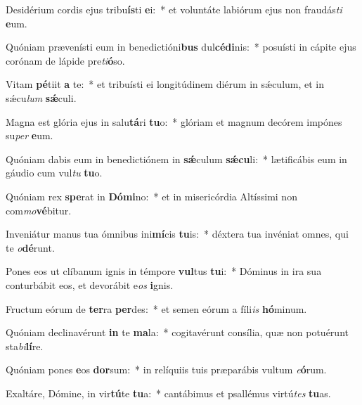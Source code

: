 \item Desidérium cordis ejus tribu\textbf{ís}ti \textbf{e}i:~* et voluntáte labiórum ejus non fraudás\textit{ti} \textbf{e}um.
\item Quóniam prævenísti eum in benedictióni\textbf{bus} dul\textbf{cé}\textbf{di}nis:~* posuísti in cápite ejus corónam de lápide pre\textit{ti}\textbf{ó}so.
\item Vitam \textbf{pé}tiit \textbf{a} te:~* et tribuísti ei longitúdinem diérum in sǽculum, et in sǽcu\textit{lum} \textbf{sǽ}culi.
\item Magna est glória ejus in salu\textbf{tá}ri \textbf{tu}o:~* glóriam et magnum decórem impónes su\textit{per} \textbf{e}um.
\item Quóniam dabis eum in benedictiónem in \textbf{sǽ}culum \textbf{sǽ}\textbf{cu}li:~* lætificábis eum in gáudio cum vul\textit{tu} \textbf{tu}o.
\item Quóniam rex \textbf{spe}rat in \textbf{Dó}\textbf{mi}no:~* et in misericórdia Altíssimi non com\textit{mo}\textbf{vé}bitur.
\item Inveniátur manus tua ómnibus ini\textbf{mí}cis \textbf{tu}is:~* déxtera tua invéniat omnes, qui te \textit{o}\textbf{dé}runt.
\item Pones eos ut clíbanum ignis in témpore \textbf{vul}tus \textbf{tu}i:~* Dóminus in ira sua conturbábit eos, et devorábit e\textit{os} \textbf{i}gnis.
\item Fructum eórum de \textbf{ter}ra \textbf{per}des:~* et semen eórum a fíli\textit{is} \textbf{hó}minum.
\item Quóniam declinavérunt \textbf{in} te \textbf{ma}la:~* cogitavérunt consília, quæ non potuérunt sta\textit{bi}\textbf{lí}re.
\item Quóniam pones \textbf{e}os \textbf{dor}sum:~* in relíquiis tuis præparábis vultum \textit{e}\textbf{ó}rum.
\item Exaltáre, Dómine, in vir\textbf{tú}te \textbf{tu}a:~* cantábimus et psallémus virtú\textit{tes} \textbf{tu}as.
